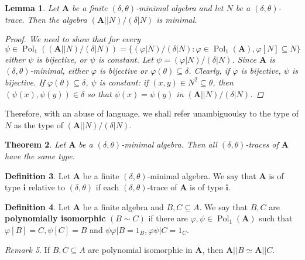 \documentclass{amsart}
\theoremstyle{plain}
\newtheorem{theorem}{Theorem}[section]
\newtheorem{lemma}[theorem]{Lemma}
\theoremstyle{definition}
\newtheorem{definition}[theorem]{Definition}
\theoremstyle{remark}
\newtheorem{remark}[theorem]{Remark}
\def\phi{\varphi}
\DeclareMathOperator{\Pol}{Pol}
\begin{document}
\begin{lemma}
    Let $\mathbf{A}$ be a finite $(\delta,\theta)$-minimal algebra and let $N$ be a $(\delta, \theta)$-trace. 
    Then the algebra $(\mathbf{A}||N)/(\delta|N)$ is minimal.
    \begin{proof}
        We need to show that for every 
        \begin{equation*}
            \psi \in \Pol_1((\mathbf{A}||N)/(\delta|N)) = \{ (\phi|N)/(\delta|N) : \phi \in \Pol_1(\mathbf{A}), \phi[N] \subseteq N\}
        \end{equation*}
        either $\psi$ is bijective, or $\psi$ is constant. 
        Let $\psi = (\phi|N)/(\delta|N)$. 
        Since $\mathbf{A}$ is $(\delta, \theta)$-minimal, either $\phi$ is bijective or $\phi(\theta) \subseteq \delta$. 
        Clearly, if $\phi$ is bijective, $\psi$ is bijective. 
        If $\phi(\theta) \subseteq \delta$, $\psi$ is constant: if $(x,y) \in N^2 \subseteq \theta$, then $(\psi(x), \psi(y)) \in \delta$ so that $\psi(x)=\psi(y)$ in $(\mathbf{A}||N)/(\delta|N)$.  
    \end{proof}  
\end{lemma}

Therefore, with an abuse of language, we shall refer unambiguoulsy to the type of $N$ as the type of $ (\mathbf{A}||N)/(\delta|N)$. 


\begin{theorem}
    Let $\mathbf{A}$ be a $(\delta, \theta)$-minimal algebra. 
    Then all $(\delta, \theta)$-traces of $\mathbf{A}$ have the same type.
\end{theorem}

\begin{definition}
    Let $\mathbf{A}$ be a finite $(\delta, \theta)$-minimal algebra. 
    We say that $\mathbf{A}$ is of type $\mathbf{i}$ relative to $(\delta, \theta)$ if each $(\delta, \theta)$-trace of $\mathbf{A}$ is of type $\mathbf{i}$. 
\end{definition}


\begin{definition}
    Let $\mathbf{A}$ be a finite algebra and $B,C \subseteq A$. 
    We say that $B,C$ are \textbf{polynomially isomorphic} $(B \sim C)$ if there are $\phi, \psi \in \Pol_1(\mathbf{A})$ such that 
    $\phi[B] = C, \psi[C]=B$ and $\psi \phi | B = 1_B, \phi \psi | C = 1_C$. 
\end{definition}

\begin{remark}
    If $B,C \subseteq A$ are polynomial isomorphic in $\mathbf{A}$, then $\mathbf{A}||B \simeq \mathbf{A}||C$. 
\end{remark}
\end{document}
